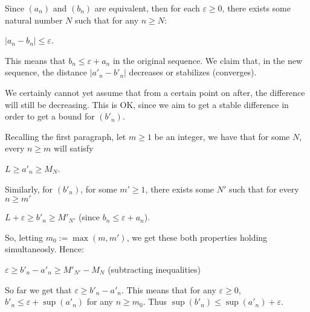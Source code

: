 \documentclass{article}
\theoremstyle{remark}
\begin{document}
\begin{enumerate}
        Since $(a_n)$ and $(b_n)$ are equivalent, then for each $\varepsilon \geq 0$, there exists some natural number
        $N$ such that for any $n \geq N$:
        \begin{center}
            $\vert a_n - b_n \vert \leq \varepsilon$.
        \end{center}
        This means that $b_n \leq \varepsilon + a_n$ in the original sequence.
        We claim that, in the new sequence, the distance $\vert a'_n - b'_n \vert$ decreases or stabilizes (converges).

        We certainly cannot yet assume that from a certain point on after, the difference will still be decreasing. This is OK,
        since we aim to get a stable difference in order to get a bound for $(b'_n)$.

        Recalling the first paragraph, let $m \geq 1$ be an integer, we have that for some $N$,
        every $n \geq m$ will satisfy
        \begin{center}
            $L \geq a'_n \geq M_N$.
        \end{center}
        Similarly, for $(b'_n)$, for some $m'\geq 1$, there exists some $N'$ such that for every $n \geq m'$
        \begin{center}
            $L + \varepsilon \geq b'_n \geq M'_{N'}$ (since $b_n \leq \varepsilon + a_n$).
        \end{center}
        So, letting $m_0 := \max(m, m')$, we get these both properties holding simultaneosly.
        Hence:
        \begin{center}
            $\varepsilon \geq b'_n - a'_n \geq M'_{N'} - M_N$ (subtracting inequalities)
        \end{center}
        
        So far we get that $\varepsilon \geq b'_n - a'_n$. This means that for any $\varepsilon \geq 0$, 
        $b'_n \leq \varepsilon + \sup(a'_n)$ for any $n \geq m_0$.
        Thus $\sup (b'_n) \leq \sup(a'_n) + \varepsilon$.


\end{enumerate}
\end{document}

